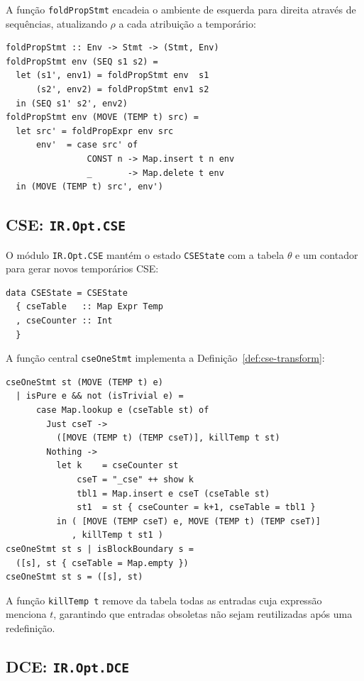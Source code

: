A função \texttt{foldPropStmt} encadeia o ambiente de esquerda para direita
através de sequências, atualizando $\rho$ a cada atribuição a temporário:

\begin{verbatim}
foldPropStmt :: Env -> Stmt -> (Stmt, Env)
foldPropStmt env (SEQ s1 s2) =
  let (s1', env1) = foldPropStmt env  s1
      (s2', env2) = foldPropStmt env1 s2
  in (SEQ s1' s2', env2)
foldPropStmt env (MOVE (TEMP t) src) =
  let src' = foldPropExpr env src
      env'  = case src' of
                CONST n -> Map.insert t n env
                _       -> Map.delete t env
  in (MOVE (TEMP t) src', env')
\end{verbatim}

\subsection{CSE: \texttt{IR.Opt.CSE}}\label{sec:impl-cse}

O módulo \texttt{IR.Opt.CSE} mantém o estado \texttt{CSEState} com a tabela
$\theta$ e um contador para gerar novos temporários CSE:

\begin{verbatim}
data CSEState = CSEState
  { cseTable   :: Map Expr Temp
  , cseCounter :: Int
  }
\end{verbatim}

A função central \texttt{cseOneStmt} implementa a
Definição~\ref{def:cse-transform}:

\begin{verbatim}
cseOneStmt st (MOVE (TEMP t) e)
  | isPure e && not (isTrivial e) =
      case Map.lookup e (cseTable st) of
        Just cseT ->
          ([MOVE (TEMP t) (TEMP cseT)], killTemp t st)
        Nothing ->
          let k    = cseCounter st
              cseT = "_cse" ++ show k
              tbl1 = Map.insert e cseT (cseTable st)
              st1  = st { cseCounter = k+1, cseTable = tbl1 }
          in ( [MOVE (TEMP cseT) e, MOVE (TEMP t) (TEMP cseT)]
             , killTemp t st1 )
cseOneStmt st s | isBlockBoundary s =
  ([s], st { cseTable = Map.empty })
cseOneStmt st s = ([s], st)
\end{verbatim}

A função \texttt{killTemp t} remove da tabela todas as entradas cuja
expressão menciona $t$, garantindo que entradas obsoletas não sejam reutilizadas
após uma redefinição.

\subsection{DCE: \texttt{IR.Opt.DCE}}\label{sec:impl-dce}

